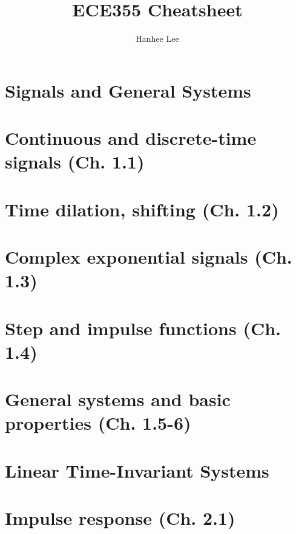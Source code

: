 \documentclass{article}
\title{ECE355 Cheatsheet}
\author{Hanhee Lee}
\begin{document}
\maketitle

\tableofcontents

\listoffigures

\listoftables

\section*{Signals and General Systems}
\section{Continuous and discrete-time signals (Ch. 1.1)}


\section{Time dilation, shifting (Ch. 1.2)}


\section{Complex exponential signals (Ch. 1.3)}


\section{Step and impulse functions (Ch. 1.4)}


\section{General systems and basic properties (Ch. 1.5-6)}


\section*{Linear Time-Invariant Systems}
\section{Impulse response (Ch. 2.1)}

\end{document}
